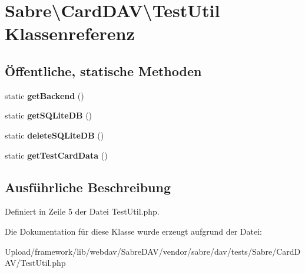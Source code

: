 \hypertarget{class_sabre_1_1_card_d_a_v_1_1_test_util}{}\section{Sabre\textbackslash{}Card\+D\+AV\textbackslash{}Test\+Util Klassenreferenz}
\label{class_sabre_1_1_card_d_a_v_1_1_test_util}
\subsection*{Öffentliche, statische Methoden}
\begin{DoxyCompactItemize}
\item 
\mbox{\label{class_sabre_1_1_card_d_a_v_1_1_test_util_a5a35b70b6bb069422b8d69c39273e9bb}} 
static {\bfseries get\+Backend} ()
\item 
\mbox{\label{class_sabre_1_1_card_d_a_v_1_1_test_util_a5ecc664aed10e9e945163fab73aff8ff}} 
static {\bfseries get\+S\+Q\+Lite\+DB} ()
\item 
\mbox{\label{class_sabre_1_1_card_d_a_v_1_1_test_util_acf3d442de70abfe40695733007eb1dfe}} 
static {\bfseries delete\+S\+Q\+Lite\+DB} ()
\item 
\mbox{\label{class_sabre_1_1_card_d_a_v_1_1_test_util_ac3c7cb5a4a9651126bb7503ffa17f197}} 
static {\bfseries get\+Test\+Card\+Data} ()
\end{DoxyCompactItemize}


\subsection{Ausführliche Beschreibung}


Definiert in Zeile 5 der Datei Test\+Util.\+php.



Die Dokumentation für diese Klasse wurde erzeugt aufgrund der Datei\+:\begin{DoxyCompactItemize}
\item 
Upload/framework/lib/webdav/\+Sabre\+D\+A\+V/vendor/sabre/dav/tests/\+Sabre/\+Card\+D\+A\+V/Test\+Util.\+php\end{DoxyCompactItemize}
